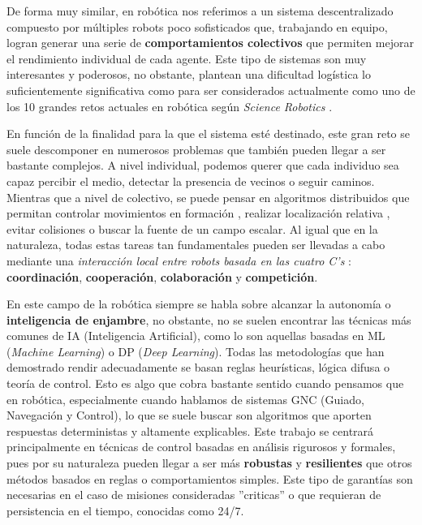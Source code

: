 De forma muy similar, en robótica nos referimos a un sistema descentralizado compuesto por múltiples robots poco sofisticados que, trabajando en equipo, logran generar una serie de \textbf{comportamientos colectivos} que permiten mejorar el rendimiento individual de cada agente. Este tipo de sistemas son muy interesantes y poderosos, no obstante, plantean una dificultad logística lo suficientemente significativa como para ser considerados actualmente como uno de los 10 grandes retos actuales en robótica según \textit{Science Robotics} \cite{10challenges}.


En función de la finalidad para la que el sistema esté destinado, este gran reto se suele descomponer en numerosos problemas que también pueden llegar a ser bastante complejos. A nivel individual, podemos querer que cada individuo sea capaz percibir el medio, detectar la presencia de vecinos o seguir caminos. Mientras que a nivel de colectivo, se puede pensar en algoritmos distribuidos que permitan controlar movimientos en formación \cite{complex_laplacian}, realizar localización relativa \cite{relative_location}, evitar colisiones o buscar la fuente de un campo escalar. Al igual que en la naturaleza, todas estas tareas tan fundamentales pueden ser llevadas a cabo mediante una \emph{interacción local entre robots basada en las cuatro C's} \cite{resilient_swarm}: \textbf{coordinación}, \textbf{cooperación}, \textbf{colaboración} y \textbf{competición}.

\newpage

En este campo de la robótica siempre se habla sobre alcanzar la autonomía o \textbf{inteligencia de enjambre}, no obstante, no se suelen encontrar las técnicas más comunes de IA (Inteligencia Artificial), como lo son aquellas basadas en ML (\textit{Machine Learning}) o DP (\textit{Deep Learning}). Todas las metodologías que han demostrado rendir adecuadamente se basan reglas heurísticas, lógica difusa o teoría de control. Esto es algo que cobra bastante sentido cuando pensamos que en robótica, especialmente cuando hablamos de sistemas GNC (Guiado, Navegación y Control), lo que se suele buscar son algoritmos que aporten respuestas deterministas y altamente explicables. Este trabajo se centrará principalmente en técnicas de control basadas en análisis rigurosos y formales, pues por su naturaleza pueden llegar a ser más \textbf{robustas} y \textbf{resilientes} que otros métodos basados en reglas o comportamientos simples. Este tipo de garantías son necesarias en el caso de misiones consideradas ''criticas'' o que requieran de persistencia en el tiempo, conocidas como 24/7.

